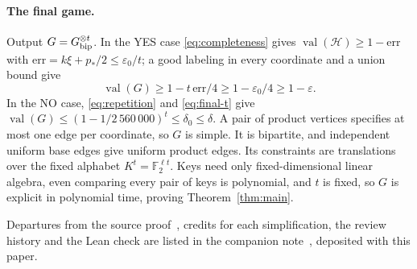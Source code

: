 \documentclass[11pt]{article}
\newcommand{\F}{\mathbb F}
\newcommand{\eps}{\varepsilon}
\newcommand{\val}{\operatorname{val}}
\begin{document}
\paragraph{The final game.} Output $G=G_{\rm bip}^{\otimes t}$. In the YES
case \eqref{eq:completeness} gives $\val(\mathcal H)\ge1-\mathrm{err}$ with
$\mathrm{err}=k\xi+p_*/2\le\eps_0/t$; a good labeling in every
coordinate and a union bound give
\[
 \val(G)\ge1-t\,\mathrm{err}/4\ge1-\eps_0/4\ge1-\eps.
\]
In the NO case, \eqref{eq:repetition} and \eqref{eq:final-t} give
$\val(G)\le(1-1/2\,560\,000)^t\le\delta_0\le\delta$. A pair of product
vertices specifies at most one edge per coordinate, so $G$ is simple. It is
bipartite, and independent uniform base edges give uniform product edges. Its
constraints are translations over the fixed alphabet $K^t=\F_2^{\ell t}$.
Keys need only fixed-dimensional linear algebra, even comparing every pair
of keys is polynomial, and $t$ is fixed, so $G$ is explicit in polynomial
time, proving Theorem~\ref{thm:main}.

{\small
\medskip\noindent Departures from the source proof~\cite{UGT}, credits for each
simplification, the review history and the Lean check are listed in the
companion note~\cite{Notes}, deposited with this paper.\par
}
\end{document}

